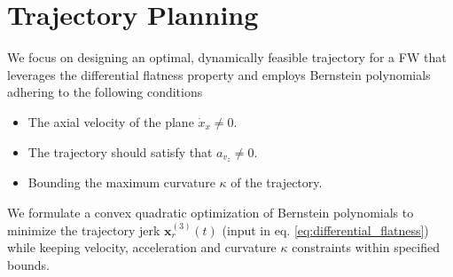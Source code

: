 \section{Trajectory Planning}
\label{sec:Planning}

We focus on designing an optimal, dynamically feasible trajectory for a FW that leverages the differential flatness property and employs Bernstein polynomials adhering to the following conditions

 
\begin{itemize}
    \item The axial velocity of the plane $\dot{x}_{x} \neq 0$.
    \item The trajectory should satisfy that $a_{v_z} \neq 0 $.
    \item Bounding the maximum curvature $\kappa$ of the trajectory.
\end{itemize}
We formulate a convex quadratic optimization of Bernstein polynomials to minimize the trajectory jerk $\mathbf{x}_{r}^{(3)}(t)$ (input in eq. \eqref{eq:differential_flatness}) while keeping velocity, acceleration and curvature $\kappa$ constraints within specified bounds. %


